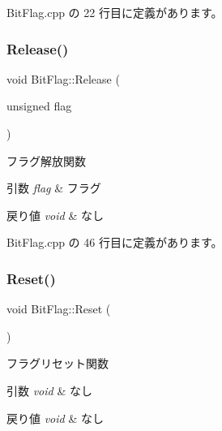  Bit\+Flag.\+cpp の 22 行目に定義があります。

\mbox{\label{class_bit_flag_aa164c8084a8e7d3fadd983f330824a2e}} 
\subsubsection{\texorpdfstring{Release()}{Release()}}
{\footnotesize\ttfamily void Bit\+Flag\+::\+Release (\begin{DoxyParamCaption}\item[{unsigned}]{flag }\end{DoxyParamCaption})}



フラグ解放関数 


\begin{DoxyParams}{引数}
{\em flag} & フラグ \\
\hline
\end{DoxyParams}

\begin{DoxyRetVals}{戻り値}
{\em void} & なし \\
\hline
\end{DoxyRetVals}


 Bit\+Flag.\+cpp の 46 行目に定義があります。

\mbox{\label{class_bit_flag_a54519ca6c7daed4a5a3bb1e89d271901}} 
\subsubsection{\texorpdfstring{Reset()}{Reset()}}
{\footnotesize\ttfamily void Bit\+Flag\+::\+Reset (\begin{DoxyParamCaption}{ }\end{DoxyParamCaption})}



フラグリセット関数 


\begin{DoxyParams}{引数}
{\em void} & なし \\
\hline
\end{DoxyParams}

\begin{DoxyRetVals}{戻り値}
{\em void} & なし \\
\hline
\end{DoxyRetVals}


